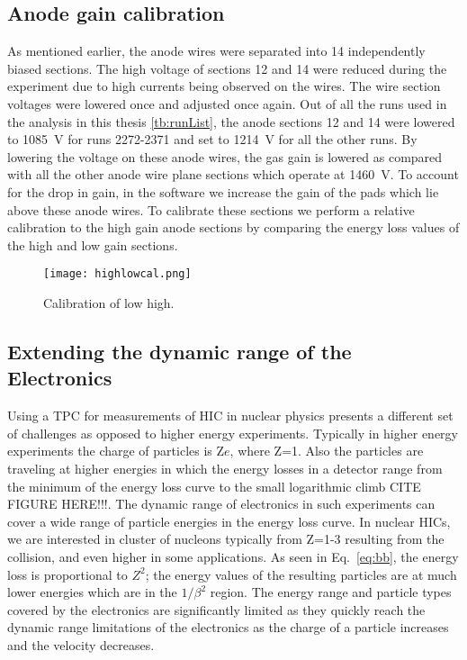 \subsection{Anode gain calibration}

As mentioned earlier, the anode wires were separated into 14 independently biased sections. The high voltage of sections 12 and 14 were reduced during the experiment due to high currents being observed on the wires. The wire section voltages were lowered once and adjusted once again. Out of all the runs used in the analysis in this thesis \ref{tb:runList}, the anode sections 12 and 14 were lowered to \SI{1085}{\volt} for runs 2272-2371 and set to \SI{1214}{\volt} for all the other runs. By lowering the voltage on these anode wires, the gas gain is lowered as compared with all the other anode wire plane sections which operate at \SI{1460}{\volt}. To account for the drop in gain, in the software we increase the gain of the pads which lie above these anode wires. To calibrate these sections we perform a relative calibration to the high gain anode sections by comparing the energy loss values of the high and low gain sections. 


\begin{figure}[H]
\texttt{[image: highlowcal.png]}
\caption{Calibration of low high.}
\label{fig:highlowcal}
\end{figure}


\subsection{Extending the dynamic range of the Electronics}
Using a TPC for measurements of HIC in nuclear physics presents a different set of challenges as opposed to higher energy experiments. Typically in higher energy experiments the charge of particles is Z$e$, where Z=1. Also the particles are traveling at higher energies in which the energy losses in a detector range from the minimum of the energy loss curve to the small logarithmic climb CITE FIGURE HERE!!!. The dynamic range of electronics in such experiments can cover a wide range of particle energies in the energy loss curve. In nuclear HICs, we are interested in cluster of nucleons typically from Z=1-3 resulting from the collision, and even higher in some applications. As seen in Eq.~\ref{eq:bb}, the energy loss is proportional to $Z^2$; the energy values of the resulting particles are at much lower energies which are in the $1/\beta^2$ region. The energy range and particle types covered by the electronics are significantly limited as they quickly reach the dynamic range limitations of the electronics as the charge of a particle increases and the velocity decreases. 

